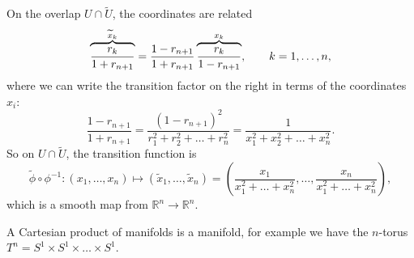 \begin{example}[sphere $S^n = \left\{ \vb{r} \in \mathbb{R}^{n + 1}, \abs{\vb{r}} = 1 \right\}$ ]
  On the overlap $U \cap \widetilde{U}$, the coordinates are related
  \begin{equation}
    \overbrace{\frac{r_k}{1 + r_{n+1}}}^{\mathclap{\widetilde{x}_k}} = \frac{1 - r_{n+1}}{1 + r_{n+1}} \overbrace{\frac{r_k}{1 - r_{n+1}}}^{\mathclap{x_k}}, \qquad k = 1, \dots, n,
  \end{equation}
  where we can write the transition factor on the right in terms of the coordinates $x_i$:
  \begin{equation}
    \frac{1 - r_{n+1}}{1 + r_{n+1}} = \frac{(1 - r_{n+1})^2}{r^2_1 + r^2_2 + \dots + r^2_n} = \frac{1}{x^2_1 + x^2_2 + \dots + x^2_n}.
  \end{equation}
  So on $U \cap \widetilde{U}$, the transition function is
  \begin{equation}
    \widetilde{\phi} \circ \phi^{-1}\colon 
    (x_1, \dots, x_n)
    \mapsto
    (\widetilde{x}_1, \dots, \widetilde{x}_n) = \left( \frac{x_1}{x^2_1 + \dots + x^2_n}, \dots, \frac{x_n}{x^2_1 + \dots + x^2_n} \right),
  \end{equation}
  which is a smooth map from $\mathbb{R}^n \to \mathbb{R}^n$.
\end{example}
\begin{example}[]
  A Cartesian product of manifolds is a manifold, for example we have the $n$-torus $T^n = S^1 \times S^1 \times \dots \times S^1$.
\end{example}
